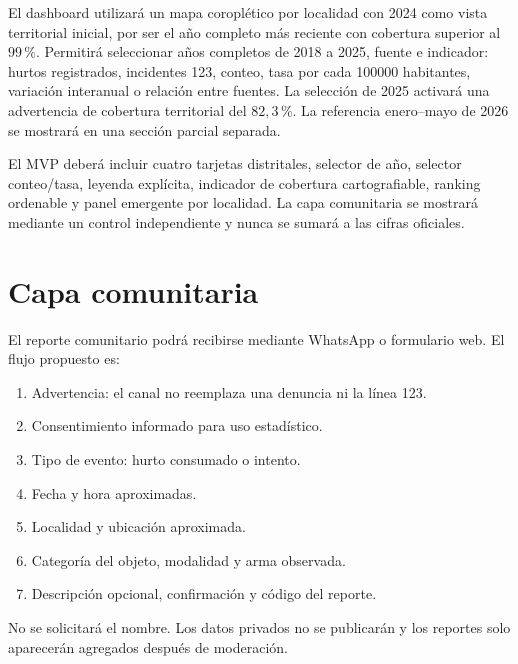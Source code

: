 \documentclass[11pt,letterpaper,oneside]{report}
\begin{document}
El dashboard utilizará un mapa coroplético por localidad con 2024 como vista territorial inicial, por ser el año completo más reciente con cobertura superior al \(99\,\%\). Permitirá seleccionar años completos de 2018 a 2025, fuente e indicador: hurtos registrados, incidentes 123, conteo, tasa por cada \num{100000} habitantes, variación interanual o relación entre fuentes. La selección de 2025 activará una advertencia de cobertura territorial del \(82{,}3\,\%\). La referencia enero--mayo de 2026 se mostrará en una sección parcial separada.

El MVP deberá incluir cuatro tarjetas distritales, selector de año, selector conteo/tasa, leyenda explícita, indicador de cobertura cartografiable, ranking ordenable y panel emergente por localidad. La capa comunitaria se mostrará mediante un control independiente y nunca se sumará a las cifras oficiales.

\section{Capa comunitaria}

El reporte comunitario podrá recibirse mediante WhatsApp o formulario web. El flujo propuesto es:

\begin{enumerate}
  \item Advertencia: el canal no reemplaza una denuncia ni la línea 123.
  \item Consentimiento informado para uso estadístico.
  \item Tipo de evento: hurto consumado o intento.
  \item Fecha y hora aproximadas.
  \item Localidad y ubicación aproximada.
  \item Categoría del objeto, modalidad y arma observada.
  \item Descripción opcional, confirmación y código del reporte.
\end{enumerate}

No se solicitará el nombre. Los datos privados no se publicarán y los reportes solo aparecerán agregados después de moderación.
\end{document}
